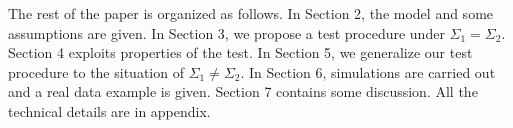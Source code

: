 The rest of the paper is organized as follows. In Section 2,  the model and some assumptions are given.  In Section 3, we propose a test procedure under $\Sigma_1=\Sigma_2$. Section 4 exploits properties of the test. In Section 5, we generalize our test procedure to the situation of $\Sigma_1\neq \Sigma_2$. In Section 6, simulations are carried out and  a real data example is given. Section 7 contains some discussion. All the technical details are in appendix.
